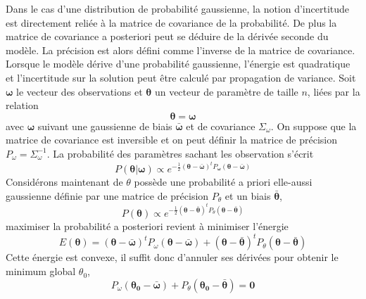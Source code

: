 \documentclass[../main/These_Mathias_Paget.tex]{subfiles}
\begin{document}
Dans le cas d'une distribution de probabilité gaussienne, la notion d'incertitude est directement reliée à la matrice de covariance de la probabilité. De plus la matrice de covariance a posteriori peut se déduire de la dérivée seconde du modèle. La précision est alors défini comme l’inverse de la matrice de covariance. Lorsque le modèle dérive d'une probabilité gaussienne, l'énergie est quadratique et l'incertitude sur la solution peut être calculé par propagation de variance. Soit $\boldsymbol{\omega}$ le vecteur des observations et $\boldsymbol{\theta}$ un vecteur de paramètre de taille $n$, liées par la relation
\begin{equation}
\boldsymbol{\theta} = \boldsymbol{\omega}
\end{equation}
avec $\boldsymbol{\omega}$  suivant une gaussienne de biais $\boldsymbol{\bar{\omega}}$ et de covariance $\Sigma_{\omega}$. On suppose que la matrice de covariance est inversible et on peut définir la matrice de précision $P_{\omega} = \Sigma_{\omega}^{-1}$. La probabilité des paramètres sachant les observation s'écrit
\begin{equation}
P(\boldsymbol{\theta}|\boldsymbol{\omega}) \propto  e^{-\frac{1}{2}(\boldsymbol{\theta}-\boldsymbol{\bar{\omega}})^{t}P_{\boldsymbol{\omega}}(\boldsymbol{\theta}-\boldsymbol{\bar{\omega}})}
\end{equation}
Considérons maintenant de $\theta$ possède une probabilité a priori elle-aussi gaussienne définie par une matrice de précision $P_\theta$ et un biais $\boldsymbol{\bar{\theta}}$,
\begin{equation}
P(\boldsymbol{\theta}) \propto e^{-\frac{1}{2}(\boldsymbol{\theta}-\boldsymbol{\bar{\theta}})^{t}P_\theta(\boldsymbol{\theta}-\boldsymbol{\bar{\theta}})}
\end{equation}
maximiser la probabilité a posteriori revient à minimiser l’énergie
\begin{equation}
E(\boldsymbol{\theta})= (\boldsymbol{\theta}-\boldsymbol{\bar{\omega}})^{t} P_\omega (\boldsymbol{\theta}-\boldsymbol{\bar{\omega}}) + (\boldsymbol{\theta}-\boldsymbol{\bar{\theta}})^{t}P_\theta(\boldsymbol{\theta}-\boldsymbol{\bar{\theta}})
\end{equation}
Cette énergie est convexe, il suffit donc d’annuler ses dérivées pour obtenir le minimum global ${\theta}_0$, 
\begin{equation}
P_\omega(\boldsymbol{{\theta}_0}-\boldsymbol{\bar{\omega}}) + P_\theta(\boldsymbol{{\theta}_0}-\boldsymbol{\bar{\theta}}) = \boldsymbol{0}
\end{equation}
\end{document}
